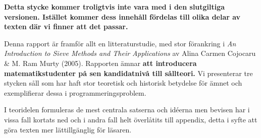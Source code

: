 
\textbf{Detta stycke kommer troligtvis inte vara med i den slutgiltiga versionen. Istället kommer dess innehåll fördelas till olika delar av texten där vi finner att det passar.}

Denna rapport är framför allt en litteraturstudie, med stor förankring i \textit{An Introduction to Sieve Methods and Their Applications} av Alina Carmen Cojocaru \& M. Ram Murty (2005). Rapporten ämnar \textbf{att introducera matematikstudenter på sen kandidatnivå till sållteori.} Vi presenterar tre stycken såll som har haft stor teoretisk och historisk betydelse för ämnet och exemplifierar dessa i programmeringsproblem. 

I teoridelen formuleras de mest centrala satserna och idéerna men bevisen har i vissa fall kortats ned och i andra fall helt överlåtits till appendix, detta i syfte att göra texten mer lättillgänglig för läsaren.


